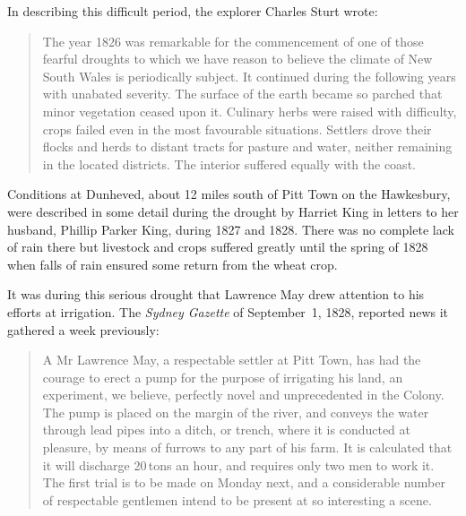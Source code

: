 In describing this difficult period, the explorer Charles Sturt
 wrote:
\begin{quote}
	The year 1826 was remarkable for the commencement of one of
	those fearful droughts to which we have reason to believe the
	climate of New South Wales is periodically subject.  It
	continued during the following years with unabated severity.
	The surface of the earth became so parched that minor
	vegetation ceased upon it.  Culinary herbs were raised with
	difficulty, crops failed even in the most favourable
	situations.  Settlers drove their flocks and herds to distant
	tracts for pasture and water, neither remaining in the located
	districts.  The interior suffered equally with the
	coast.
\end{quote}

Conditions at Dunheved, about 12 miles south of
Pitt Town on the Hawkesbury, were described in
some detail during the drought by Harriet King  in
letters to her husband, Phillip Parker King, 
during 1827 and 1828. There was no complete lack of rain there but
livestock and crops suffered greatly until the spring of 1828 when
falls of rain ensured some return from the wheat
crop.

It was during this serious drought that Lawrence May drew attention to
his efforts at irrigation.  The \textsl{Sydney Gaz\-ette} of
September~1, 1828, reported news it gathered a week previously:
\begin{quote}
	A Mr Lawrence May, a respectable settler at Pitt Town, has had
	the courage to erect a pump for the purpose of irrigating his
	land, an experiment, we believe, perfectly novel and
	unprecedented in the Colony. The pump is placed on the margin
	of the river, and conveys the water through lead pipes into a
	ditch, or trench, where it is conducted at pleasure, by means
	of furrows to any part of his farm. It is calculated that it
	will discharge 20\,tons an hour, and requires only two men to
	work it. The first trial is to be made on Monday next, and a
	considerable number of respectable gentlemen intend to be
	present at so interesting a scene.
\end{quote}

